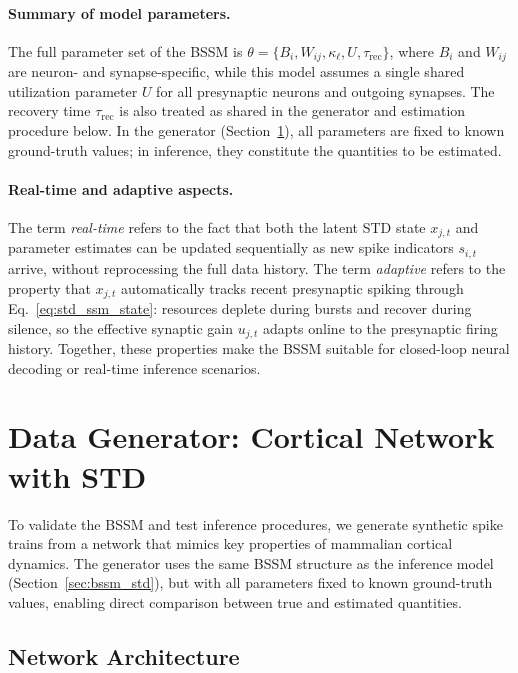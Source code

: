 \documentclass[11pt]{article}
\begin{document}
\paragraph{Summary of model parameters.}
The full parameter set of the BSSM is $\theta=\{B_i, W_{ij}, \kappa_\ell, U,
\tau_{\mathrm{rec}}\}$, where $B_i$ and $W_{ij}$ are neuron- and synapse-specific,
while this model assumes a single shared utilization parameter $U$ for all
presynaptic neurons and outgoing synapses. The recovery time
$\tau_{\mathrm{rec}}$ is also treated as shared in the generator and estimation
procedure below. In the generator
(Section~\ref{sec:generator}), all parameters are fixed to known ground-truth
values; in inference, they constitute the quantities to be estimated.

\paragraph{Real-time and adaptive aspects.}
The term \emph{real-time} refers to the fact that both the latent STD state
$x_{j,t}$ and parameter estimates can be updated sequentially as new spike
indicators $s_{i,t}$ arrive, without reprocessing the full data history. The term
\emph{adaptive} refers to the property that $x_{j,t}$ automatically tracks recent
presynaptic spiking through Eq.~\eqref{eq:std_ssm_state}: resources deplete during
bursts and recover during silence, so the effective synaptic gain $u_{j,t}$ adapts
online to the presynaptic firing history. Together, these properties make the BSSM
suitable for closed-loop neural decoding or real-time inference scenarios.

\section{Data Generator:  Cortical Network with STD}
\label{sec:generator}

To validate the BSSM and test inference procedures, we generate synthetic spike
trains from a network that mimics key properties of mammalian cortical dynamics.
The generator uses the same BSSM structure as the inference model 
(Section~\ref{sec:bssm_std}), but with all parameters fixed to known ground-truth
values, enabling direct comparison between true and estimated quantities.

\subsection{Network Architecture}
\label{sec:gen_architecture}
\end{document}
